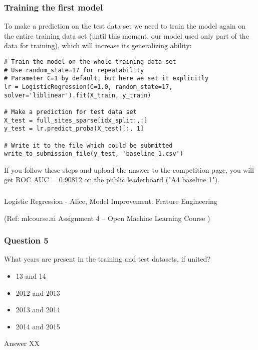 \begin{frame}[fragile]\frametitle{Training the first model}	

To make a prediction on the test data set we need to train the model again on the entire training data set (until this moment, our model used only part of the data for training), which will increase its generalizing ability:

\begin{lstlisting}
# Train the model on the whole training data set
# Use random_state=17 for repeatability
# Parameter C=1 by default, but here we set it explicitly
lr = LogisticRegression(C=1.0, random_state=17, solver='liblinear').fit(X_train, y_train)

# Make a prediction for test data set
X_test = full_sites_sparse[idx_split:,:]
y_test = lr.predict_proba(X_test)[:, 1]

# Write it to the file which could be submitted
write_to_submission_file(y_test, 'baseline_1.csv')
\end{lstlisting}
If you follow these steps and upload the answer to the competition page, you will get ROC AUC = 0.90812 on the public leaderboard ("A4 baseline 1").
\end{frame}

\begin{frame}[fragile]\frametitle{}
\begin{center}
{\Large Logistic Regression - Alice, Model Improvement: Feature Engineering}

{\tiny (Ref: mlcourse.ai Assignment 4 – Open Machine Learning Course ) }
\end{center}
\end{frame}


\begin{frame}[fragile]\frametitle{Question 5}
What years are present in the training and test datasets, if united?

\begin{itemize}
\item 13 and 14
\item 2012 and 2013
\item 2013 and 2014
\item 2014 and 2015
\end{itemize}
Answer XX
\end{frame}

